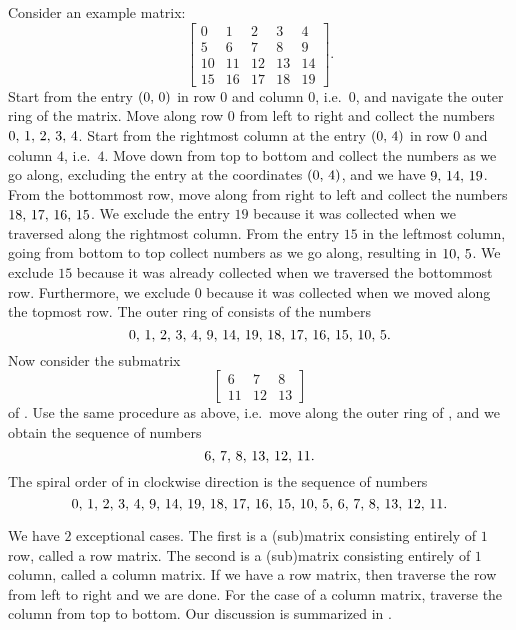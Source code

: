 Consider an example matrix:
\begin{equation}
\label{eqn:spiral:example_matrix}
\begin{bmatrix}
0  & 1  & 2  & 3  & 4  \\[4pt]
5  & 6  & 7  & 8  & 9  \\[4pt]
10 & 11 & 12 & 13 & 14 \\[4pt]
15 & 16 & 17 & 18 & 19
\end{bmatrix}.
\end{equation}
Start from the entry $\left( {0},\, {0} \right)$ in row $0$ and column $0$,
i.e.~$0$, and navigate the outer ring of the matrix.  Move along row
$0$ from left to right and collect the numbers
${0},\, {1},\, {2},\, {3},\, {4}$.  Start from the rightmost column at the
entry $\left( {0},\, {4} \right)$ in row $0$ and column $4$, i.e.~$4$.  Move down
from top to bottom and collect the numbers as we go along, excluding
the entry at the coordinates $\left( {0},\, {4} \right)$, and we have
${9},\, {14},\, {19}$.  From the bottommost row, move along from right
to left and collect the numbers ${18},\, {17},\, {16},\, {15}$.  We exclude
the entry $19$ because it was collected when we traversed along the
rightmost column.  From the entry $15$ in the leftmost column, going
from bottom to top collect numbers as we go along, resulting in
${10},\, {5}$.  We exclude $15$ because it was already collected
when we traversed the bottommost row.  Furthermore, we exclude $0$
because it was collected when we moved along the topmost row.  The
outer ring of  consists of the
numbers
\[
{0},\, {1},\, {2},\, {3},\, {4},\,
{9},\, {14},\, {19},\,
{18},\, {17},\, {16},\, {15},\,
{10},\, {5}.
\]
Now consider the submatrix
\begin{equation}
\label{eqn:spiral:example_matrix:submatrix}
\begin{bmatrix}
6  & 7  & 8  \\[4pt]
11 & 12 & 13
\end{bmatrix}
\end{equation}
of .  Use the same procedure as
above, i.e.~move along the outer ring of
, and we obtain the
sequence of numbers
\[
{6},\, {7},\, {8},\,
{13},\, {12},\, {11}.
\]
The spiral order of  in clockwise
direction is the sequence of numbers
\[
{0},\, {1},\, {2},\, {3},\, {4},\,
{9},\, {14},\, {19},\,
{18},\, {17},\, {16},\, {15},\,
{10},\, {5},\,
{6},\, {7},\, {8},\,
{13},\, {12},\, {11}.
\]

We have $2$ exceptional cases.  The first is a (sub)matrix consisting
entirely of $1$ row, called a row matrix.  The second is a (sub)matrix
consisting entirely of $1$ column, called a column matrix.  If we have
a row matrix, then traverse the row from left to right and we are
done.  For the case of a column matrix, traverse the column from top
to bottom.  Our discussion is summarized in
.

\begin{algorithm}[!htbp]

\caption{%
  The spiral order of a matrix, in clockwise direction.
}
\label{alg:spiral:spiral_order_clockwise}
\end{algorithm}
